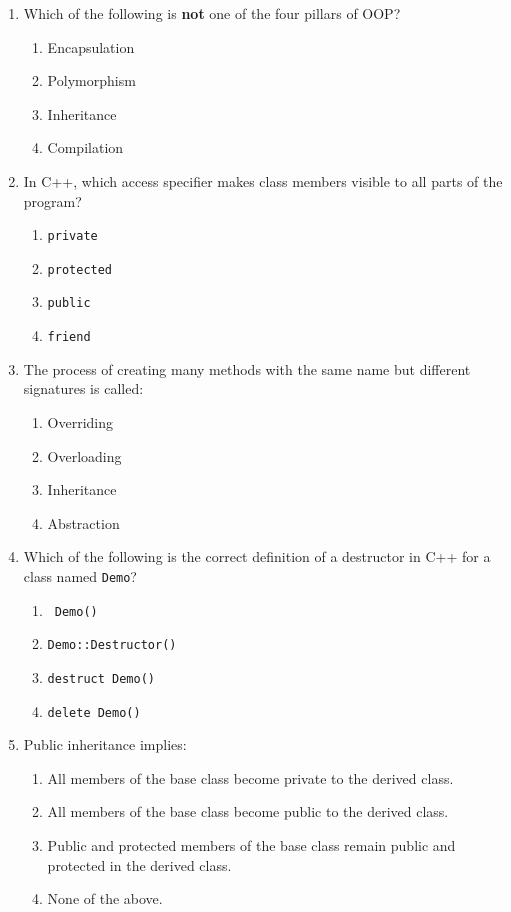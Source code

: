 \documentclass[a4paper,12pt]{article}
\begin{document}
\begin{enumerate}
    \item Which of the following is \textbf{not} one of the four pillars of OOP?
    \begin{enumerate}
        \item Encapsulation
        \item Polymorphism
        \item Inheritance
        \item Compilation
    \end{enumerate}
    
    \item In C++, which access specifier makes class members visible to all parts of the program?
    \begin{enumerate}
        \item \texttt{private}
        \item \texttt{protected}
        \item \texttt{public}
        \item \texttt{friend}
    \end{enumerate}
    
    \item The process of creating many methods with the same name but different signatures is called:
    \begin{enumerate}
        \item Overriding
        \item Overloading
        \item Inheritance
        \item Abstraction
    \end{enumerate}
    
    \item Which of the following is the correct definition of a destructor in C++ for a class named \texttt{Demo}?
    \begin{enumerate}
        \item \texttt{~Demo()}
        \item \texttt{Demo::Destructor()}
        \item \texttt{destruct Demo()}
        \item \texttt{delete Demo()}
    \end{enumerate}
    
    \item Public inheritance implies:
    \begin{enumerate}
        \item All members of the base class become private to the derived class.
        \item All members of the base class become public to the derived class.
        \item Public and protected members of the base class remain public and protected in the derived class.
        \item None of the above.
    \end{enumerate}
    

\end{enumerate}
\end{document}

